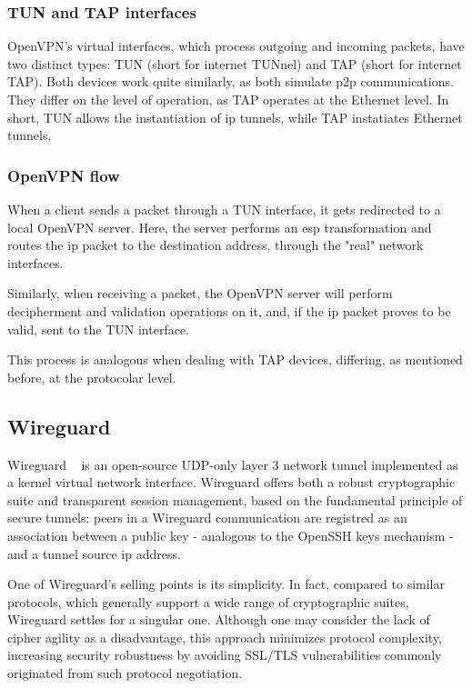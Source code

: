 \documentclass[11pt,twoside,a4paper]{report}
\begin{document}
\subsubsection{TUN and TAP interfaces}

OpenVPN's virtual interfaces, which process outgoing and incoming packets, have two distinct types: TUN (short for internet TUNnel) and TAP (short for internet TAP). Both devices work quite similarly, as both simulate \ac{p2p} communications. They differ on the level of operation, as TAP operates at the Ethernet level. In short, TUN allows the instantiation of \ac{ip} tunnels, while TAP instatiates Ethernet tunnels.

\subsubsection{OpenVPN flow}

When a client sends a packet through a TUN interface, it gets redirected to a local OpenVPN server. Here, the server performs an \ac{esp} transformation and routes the \ac{ip} packet to the destination address, through the "real" network interfaces.

Similarly, when receiving a packet, the OpenVPN server will perform decipherment and validation operations on it, and, if the \ac{ip} packet proves to be valid, sent to the TUN interface.

This process is analogous when dealing with TAP devices, differing, as mentioned before, at the protocolar level.

\subsection{Wireguard}

Wireguard ~\cite{donenfeld2017wireguard} is an open-source UDP-only layer 3 network tunnel implemented as a kernel virtual network interface. Wireguard offers both a robust cryptographic suite and transparent session management, based on the fundamental principle of secure tunnels: peers in a Wireguard communication are registred as an association between a public key - analogous to the OpenSSH keys mechanism - and a tunnel source \ac{ip} address.

One of Wireguard's selling points is its simplicity. In fact, compared to similar protocols, which generally support a wide range of cryptographic suites, Wireguard settles for a singular one. Although one may consider the lack of cipher agility as a disadvantage, this approach minimizes protocol complexity, increasing security robustness by avoiding SSL/TLS vulnerabilities commonly originated from such protocol negotiation.
\end{document}

